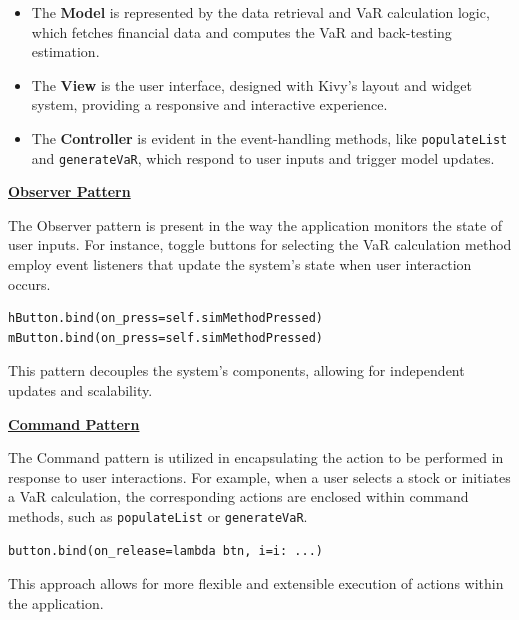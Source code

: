 \documentclass{article}
\begin{document}
\begin{itemize}
    \item The \textbf{Model} is represented by the data retrieval and VaR calculation logic, which fetches financial data and computes the VaR and back-testing estimation.
    \item The \textbf{View} is the user interface, designed with Kivy's layout and widget system, providing a responsive and interactive experience.
    \item The \textbf{Controller} is evident in the event-handling methods, like \texttt{populateList} and \texttt{generateVaR}, which respond to user inputs and trigger model updates.
\end{itemize}

\underline{\textbf{Observer Pattern}}\\\vspace{0.3cm}

The Observer pattern is present in the way the application monitors the state of user inputs. For instance, toggle buttons for selecting the VaR calculation method employ event listeners that update the system's state when user interaction occurs.

\begin{verbatim}
hButton.bind(on_press=self.simMethodPressed)
mButton.bind(on_press=self.simMethodPressed)
\end{verbatim}

This pattern decouples the system's components, allowing for independent updates and scalability.\\\vspace{0.3cm}

\underline{\textbf{Command Pattern}}\\\vspace{0.3cm}

The Command pattern is utilized in encapsulating the action to be performed in response to user interactions. For example, when a user selects a stock or initiates a VaR calculation, the corresponding actions are enclosed within command methods, such as \texttt{populateList} or \texttt{generateVaR}.

\begin{verbatim}
button.bind(on_release=lambda btn, i=i: ...)
\end{verbatim}

This approach allows for more flexible and extensible execution of actions within the application.\\\vspace{0.3cm}
\end{document}
